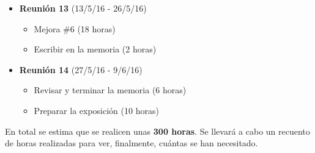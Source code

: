 \begin{itemize}
	\item \textbf{Reunión 13} (13/5/16 - 26/5/16)
	\begin{itemize}
		\item Mejora \#6 (18 horas)
		\item Escribir en la memoria (2 horas)
	\end{itemize}
	
	\item \textbf{Reunión 14} (27/5/16 - 9/6/16)
	\begin{itemize}
		\item Revisar y terminar la memoria (6 horas)
		\item Preparar la exposición (10 horas)
	\end{itemize}
\end{itemize}

En total se estima que se realicen unas \textbf{300 horas}. Se llevará a cabo un recuento de horas realizadas para ver, finalmente, cuántas se han necesitado.